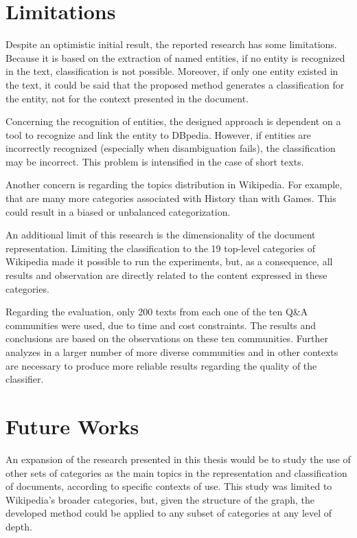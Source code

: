 \section{\hspace*{3pt}  Limitations}

Despite an optimistic initial result, the reported research has some
limitations. Because it is based on the extraction of named entities, if no entity is recognized in the text, classification is not possible.
Moreover, if only one entity existed in the text, it could be said that the proposed method generates a classification for the entity, not for the context presented in the document.

Concerning the recognition of entities, the designed approach is dependent on a tool to recognize and link the entity to DBpedia. However, if entities are incorrectly recognized (especially when disambiguation fails), the classification may be incorrect. This problem is intensified in the case of short texts.

Another concern is regarding the topics distribution in Wikipedia. For example, that are many more categories associated with History than with Games. This could result in a biased or unbalanced categorization. 

An additional limit of this research is the dimensionality of the document representation. Limiting the classification to the 19 top-level categories of Wikipedia made it possible to run the experiments, but, as a consequence, all results and observation are directly related to the content expressed in these categories.

Regarding the evaluation, only 200 texts from each one of the ten Q\&A communities were used, due to time and cost constraints. The results and conclusions are based on the observations on these ten communities.  Further analyzes in a larger number of more diverse communities and in other contexts are necessary to produce more reliable results regarding the quality of the classifier.


\section{\hspace*{3pt}  Future Works}

An expansion of the research presented in this thesis would be to study the use of
other sets of categories as the main topics in the representation and classification of documents, according to specific contexts of use.  This study was limited to Wikipedia's broader categories, but, given the structure of the graph, the developed method could be applied to any subset of categories at any level of depth.  

